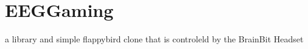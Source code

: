 \chapter{EEGGaming}
\hypertarget{md__r_e_a_d_m_e}{}\label{md__r_e_a_d_m_e}
\label{md__r_e_a_d_m_e_autotoc_md0}%
%


a library and simple flappybird clone that is controleld by the Brain\+Bit Headset 